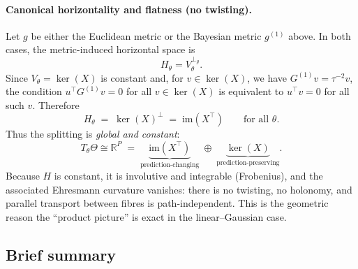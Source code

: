 \paragraph{Canonical horizontality and flatness (no twisting).}
Let $g$ be either the Euclidean metric or the Bayesian metric $g^{(1)}$ above.
In both cases, the metric-induced horizontal space is
\[
H_\theta = V_\theta^{\perp_g}.
\]
Since $V_\theta=\ker(X)$ is constant and, for $v\in\ker(X)$, we have $G^{(1)}v=\tau^{-2}v$,
the condition $u^\top G^{(1)}v=0$ for all $v\in\ker(X)$ is equivalent to $u^\top v=0$ for all such $v$.
Therefore
\[
H_\theta \;=\; \ker(X)^{\perp} \;=\; \mathrm{im}(X^\top)
\qquad\text{for all }\theta.
\]
Thus the splitting is \emph{global and constant}:
\[
T_\theta\Theta \cong \mathbb R^P
\;=\;
\underbrace{\mathrm{im}(X^\top)}_{\text{prediction-changing}}
\;\oplus\;
\underbrace{\ker(X)}_{\text{prediction-preserving}}.
\]
Because $H$ is constant, it is involutive and integrable (Frobenius), and the associated
Ehresmann curvature vanishes:
there is no twisting, no holonomy, and parallel transport between fibres is path-independent.
This is the geometric reason the ``product picture'' is exact in the linear--Gaussian case.

\subsection{Brief summary}
\label{subsec:takeaway_lazy_reader}

